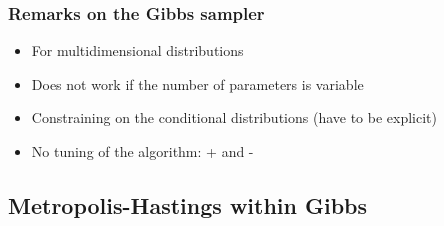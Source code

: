 \begin{frame}\frametitle{Remarks on the Gibbs sampler}
\begin{itemize}
\item For multidimensional distributions
\item Does not work if the number of parameters is variable %
\item Constraining on the conditional distributions  (have to be explicit)
\item No tuning of the algorithm: + and -
\end{itemize}


\vspace{1em}


\color{dgreen}{Visualization}
\href{https://chi-feng.github.io/mcmc-demo/app.html?algorithm=GibbsSampling&target=banana}{}
\end{frame}

  


\subsection{Metropolis-Hastings within Gibbs}   



